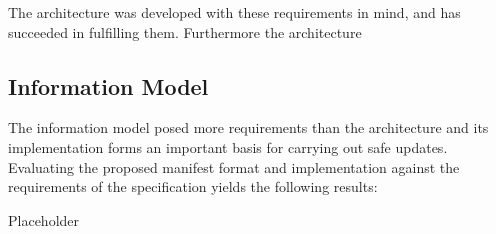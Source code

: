 \documentclass[0-thesis.tex]{subfiles}
\begin{document}
The architecture was developed with these requirements in mind, and has succeeded in
fulfilling them. Furthermore the architecture 
  
\subsection{Information Model}
\label{ssec:information-evaluation}
The information model posed more requirements than the architecture and its implementation
forms an important basis for carrying out safe updates. Evaluating the proposed manifest
format and implementation against the requirements of the specification yields the
following results:

\begin{description}
    \item[Placeholder]
\end{description}
\end{document}
